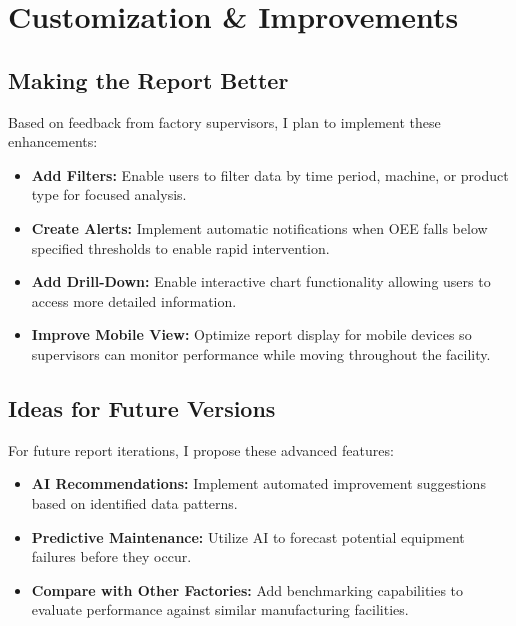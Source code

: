 \documentclass{article}
\begin{document}
\section{Customization \& Improvements}

\subsection{Making the Report Better}
Based on feedback from factory supervisors, I plan to implement these enhancements:

\begin{itemize}
    \item \textbf{Add Filters:} Enable users to filter data by time period, machine, or product type for focused analysis.
    
    \item \textbf{Create Alerts:} Implement automatic notifications when OEE falls below specified thresholds to enable rapid intervention.
    
    \item \textbf{Add Drill-Down:} Enable interactive chart functionality allowing users to access more detailed information.
    
    \item \textbf{Improve Mobile View:} Optimize report display for mobile devices so supervisors can monitor performance while moving throughout the facility.
\end{itemize}

\subsection{Ideas for Future Versions}
For future report iterations, I propose these advanced features:

\begin{itemize}
    \item \textbf{AI Recommendations:} Implement automated improvement suggestions based on identified data patterns.
    
    \item \textbf{Predictive Maintenance:} Utilize AI to forecast potential equipment failures before they occur.
    
    \item \textbf{Compare with Other Factories:} Add benchmarking capabilities to evaluate performance against similar manufacturing facilities.
\end{itemize}
\end{document}
